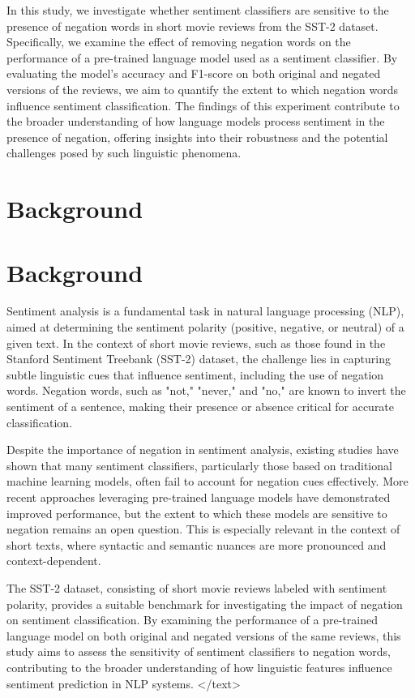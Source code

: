 \documentclass{article}
\begin{document}
In this study, we investigate whether sentiment classifiers are sensitive to the presence of negation words in short movie reviews from the SST-2 dataset. Specifically, we examine the effect of removing negation words on the performance of a pre-trained language model used as a sentiment classifier. By evaluating the model's accuracy and F1-score on both original and negated versions of the reviews, we aim to quantify the extent to which negation words influence sentiment classification. The findings of this experiment contribute to the broader understanding of how language models process sentiment in the presence of negation, offering insights into their robustness and the potential challenges posed by such linguistic phenomena.
\section{Background}
\section*{Background}

Sentiment analysis is a fundamental task in natural language processing (NLP), aimed at determining the sentiment polarity (positive, negative, or neutral) of a given text. In the context of short movie reviews, such as those found in the Stanford Sentiment Treebank (SST-2) dataset, the challenge lies in capturing subtle linguistic cues that influence sentiment, including the use of negation words. Negation words, such as "not," "never," and "no," are known to invert the sentiment of a sentence, making their presence or absence critical for accurate classification.

Despite the importance of negation in sentiment analysis, existing studies have shown that many sentiment classifiers, particularly those based on traditional machine learning models, often fail to account for negation cues effectively. More recent approaches leveraging pre-trained language models have demonstrated improved performance, but the extent to which these models are sensitive to negation remains an open question. This is especially relevant in the context of short texts, where syntactic and semantic nuances are more pronounced and context-dependent.

The SST-2 dataset, consisting of short movie reviews labeled with sentiment polarity, provides a suitable benchmark for investigating the impact of negation on sentiment classification. By examining the performance of a pre-trained language model on both original and negated versions of the same reviews, this study aims to assess the sensitivity of sentiment classifiers to negation words, contributing to the broader understanding of how linguistic features influence sentiment prediction in NLP systems.
</text>
\end{document}
